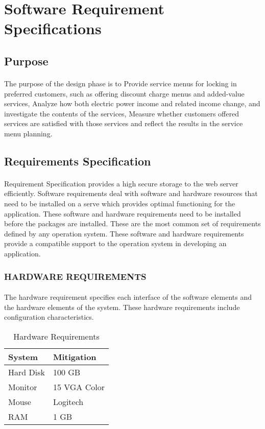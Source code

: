 \section{Software Requirement Specifications}

\subsection{Purpose}
\paragraph{}The purpose of the design phase is to Provide service menus for locking in preferred customers, such as offering discount charge menus and added-value services,
 Analyze how both electric power income and related income change, and investigate the contents of the services, Measure whether customers offered services are satisfied with those services and reflect the results in the service menu planning.
 

\subsection{Requirements Specification}
\paragraph{}Requirement Specification provides a high secure storage to the web server efficiently. Software requirements deal with software and hardware resources that need to be installed on a serve which provides optimal functioning for the application. These software and hardware requirements need to be installed before the packages are installed. These are the most common set of requirements defined by any operation system. These software and hardware requirements provide a compatible support to the operation system in developing an application.
\subsubsection{HARDWARE REQUIREMENTS}
\paragraph{}The hardware requirement specifies each interface of the software elements and the hardware elements of the system. These hardware requirements include configuration characteristics.

\begin{table}[hp!]
\caption {Hardware Requirements}
\centering
\begin{tabular}{|p{5cm}|p{7cm}|}
\hline  System	  & Mitigation \\ 
\hline  Hard Disk &  100 GB\\
\hline  Monitor & 15 VGA Color\\ 
\hline  Mouse & Logitech\\
\hline  RAM & 1 GB\\
\hline  
\end{tabular} 
\end{table}


